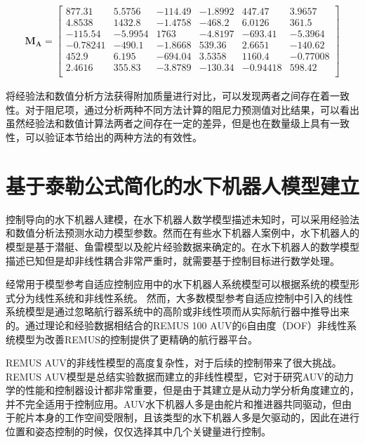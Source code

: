 \begin{equation}
\begin{aligned}
\bm{M_{A}} = \begin{bmatrix}
     877.31 &   5.5756 &  -114.49 &  -1.8992 &   447.47 &   3.9657\\
     4.8538 &   1432.8 &  -1.4758 &  -468.2  &   6.0126 &    361.5\\
     -115.54 &  -5.9954  &  1763  &  -4.8197 &  -693.41 &  -5.3964\\
     -0.78241 &  -490.1  &  -1.8668  &  539.36 & 2.6651  &  -140.62\\
     452.9  &  6.195 &  -694.04  &  3.5358 &   1160.4  & -0.77008\\
     2.4616  &  355.83 &  -3.8789 &  -130.34 &  -0.94418  &  598.42\\
         \end{bmatrix}
\end{aligned}
\end{equation}


将经验法和数值分析方法获得附加质量进行对比，可以发现两者之间存在着一致性。对于阻尼项，通过分析两种不同方法计算的阻尼力预测值对比结果，可以看出虽然经验法和数值计算法两者之间存在一定的差异，但是也在数量级上具有一致性，可以验证本节给出的两种方法的有效性。


\section{基于泰勒公式简化的水下机器人模型建立  }

控制导向的水下机器人建模，在水下机器人数学模型描述未知时，可以采用经验法和数值分析法预测水动力模型参数。然而在有些水下机器人案例中，水下机器人的模型是基于潜艇、鱼雷模型以及舵片经验数据来确定的\cite{yuanchuan2001submarine,Borst1985Fluid,bottaccini1954stablity}。在水下机器人的数学模型描述已知但是却非线性耦合非常严重时，就需要基于控制目标进行数学处理。

经常用于模型参考自适应控制应用中的水下机器人系统模型可以根据系统的模型形式分为线性系统和非线性系统。 然而，大多数模型参考自适应控制中引入的线性系统模型是通过忽略航行器系统中的高阶或非线性项而从实际航行器中推导出来的。通过理论和经验数据相结合的REMUS 100 AUV的6自由度（DOF）非线性系统模型为改善REMUS的控制提供了更精确的航行器平台。

REMUS AUV的非线性模型的高度复杂性，对于后续的控制带来了很大挑战。 REMUS AUV模型是总结实验数据而建立的非线性模型，它对于研究AUV的动力学的性能和控制器设计都非常重要，但是由于其建立是从动力学分析角度建立的，并不完全适用于控制应用。AUV水下机器人多是由舵片和推进器共同驱动，但由于舵片本身的工作空间受限制，且该类型的水下机器人多是欠驱动的，因此在进行位置和姿态控制的时候，仅仅选择其中几个关键量进行控制。

